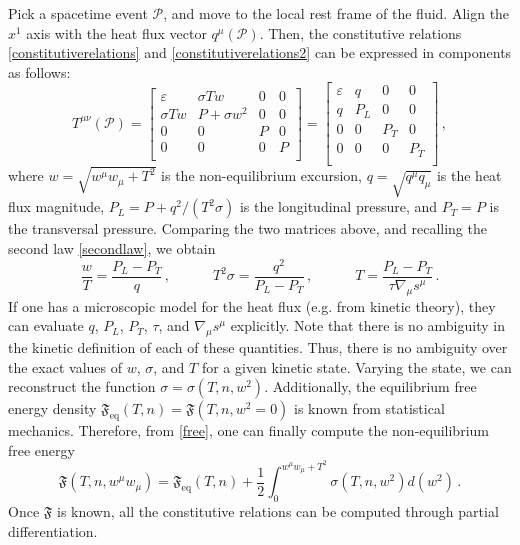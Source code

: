 \documentclass[a4paper, amsfonts, amssymb, amsmath, reprint, showkeys, nofootinbib, twoside, onecolumn, notitlepage]{revtex4-1}
\newcommand{\spc}{\quad \quad \quad}
\newcommand{\F}{{\mathfrak{F}}}
\begin{document}
Pick a spacetime event $\mathscr{P}$, and move to the local rest frame of the fluid. Align the $x^1$ axis with the heat flux vector $q^\mu(\mathscr{P})$. Then, the constitutive relations \eqref{constitutiverelations} and \eqref{constitutiverelations2} can be expressed in components as follows:
\begin{equation}\label{struzzi}
    T^{\mu \nu}(\mathscr{P})=
    \begin{bmatrix}
    \varepsilon & \sigma T w & 0 & 0 \\
    \sigma T w & P{+}\sigma w^2 & 0 & 0 \\
    0 & 0 & P & 0 \\
    0 & 0 & 0 & P \\
    \end{bmatrix}=
    \begin{bmatrix}
    \varepsilon & q & 0 & 0 \\
    q & P_L & 0 & 0 \\
    0 & 0 & P_T & 0 \\
    0 & 0 & 0 & P_T \\
    \end{bmatrix} \, ,
\end{equation}
where $w=\sqrt{w^\mu w_\mu {+}T^2}$ is the non-equilibrium excursion, $q=\sqrt{q^\mu q_\mu}$ is the heat flux magnitude, $P_L=P+q^2/(T^2 \sigma)$ is the longitudinal pressure, and $P_T=P$ is the transversal pressure. Comparing the two matrices above, and recalling the second law \eqref{secondlaw}, we obtain
\begin{equation}\label{silo}
\dfrac{w}{T} = \dfrac{P_L{-}P_T}{q} \, , \spc
T^2 \sigma = \dfrac{q^2}{P_L{-}P_T} \, , \spc
 T =\dfrac{P_L{-}P_T}{\tau \nabla_\mu s^\mu} \, . 
\end{equation}
If one has a microscopic model for the heat flux (e.g. from kinetic theory), they can evaluate $q$, $P_L$, $P_T$, $\tau$, and $\nabla_\mu s^\mu$ explicitly. Note that there is no ambiguity in the kinetic definition of each of these quantities. Thus, there is no ambiguity over the exact values of $w$, $\sigma$, and $T$ for a given kinetic state. Varying the state, we can reconstruct the function $\sigma=\sigma(T,n,w^2)$. Additionally, the equilibrium free energy density $\F_{\text{eq}}(T,n)=\F(T,n,w^2{=}0)$ is known from statistical mechanics. Therefore, from \eqref{free}, one can finally compute the non-equilibrium free energy
\begin{equation}\label{farfree}
    \F(T,n,w^\mu w_\mu) = \F_{\text{eq}}(T,n) + \dfrac{1}{2} \int_0^{w^\mu w_\mu+T^2} \! \! \! \sigma(T,n,w^2) d(w^2) \, .
\end{equation}
Once $\F$ is known, all the constitutive relations can be computed through partial differentiation.
\end{document}

